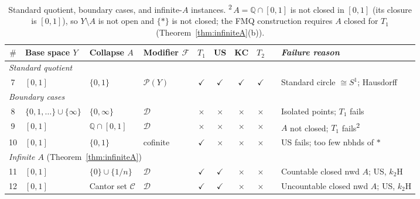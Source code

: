 \documentclass[11pt]{article}
\theoremstyle{definition}
\theoremstyle{remark}
\begin{document}
\begin{table}[h]
\centering
\small
\begin{tabular}{clllcccccl}
\hline
$\#$ & Base space $Y$ & Collapse $A$ & Modifier $\mathcal{F}$ &
$T_1$ & US & KC & $T_2$ & & \emph{Failure reason} \\
\hline
\multicolumn{10}{l}{\emph{Standard quotient}} \\
\hline
7 & $[0,1]$ & $\{0,1\}$ & $\mathcal{P}(Y)$ &
  $\checkmark$ & $\checkmark$ & $\checkmark$ & $\checkmark$ & &
  Standard circle $\cong S^1$; Hausdorff \\
\hline
\multicolumn{10}{l}{\emph{Boundary cases}} \\
\hline
8 & $\{0,1,\ldots\} \cup \{\infty\}$ & $\{0,\infty\}$ & $\mathcal{D}$ &
  $\times$ & $\times$ & $\times$ & $\times$ & &
  Isolated points; $T_1$ fails \\
9 & $[0,1]$ & $\mathbb{Q} \cap [0,1]$ & $\mathcal{D}$ &
  $\times$ & $\times$ & $\times$ & $\times$ & &
  $A$ not closed; $T_1$ fails\textsuperscript{2} \\
10 & $[0,1]$ & $\{0,1\}$ & cofinite &
  $\checkmark$ & $\times$ & $\times$ & $\times$ & &
  US fails; too few nbhds of $\ast$ \\
\hline
\multicolumn{10}{l}{\emph{Infinite $A$} (Theorem~\ref{thm:infiniteA})} \\
\hline
11 & $[0,1]$ & $\{0\} \cup \{1/n\}$ & $\mathcal{D}$ &
  $\checkmark$ & $\checkmark$ & $\times$ & $\times$ & &
  Countable closed nwd $A$; US, $k_2$H \\
12 & $[0,1]$ & Cantor set $\mathcal{C}$ & $\mathcal{D}$ &
  $\checkmark$ & $\checkmark$ & $\times$ & $\times$ & &
  Uncountable closed nwd $A$; US, $k_2$H \\
\hline
\end{tabular}
\caption{Standard quotient, boundary cases, and infinite-$A$
instances.
\textsuperscript{2}\,$A = \mathbb{Q} \cap [0,1]$ is not closed
in $[0,1]$ (its closure is $[0,1]$), so $Y \setminus A$ is not open
and $\{\ast\}$ is not closed; the FMQ construction requires $A$
closed for $T_1$ (Theorem~\ref{thm:infiniteA}(b)).}
\label{tbl:boundary}
\end{table}

\end{document}
